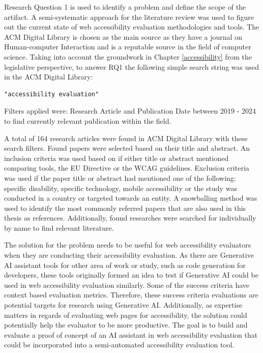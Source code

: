 Research Question 1 is used to identify a problem and define the scope of the artifact. A semi-systematic approach for the literature review was used to figure out the current state of web accessibility evaluation methodologies and tools. The ACM Digital Library is chosen as the main source as they have a journal on Human-computer Interaction and is a reputable source in the field of computer science. Taking into account the groundwork in Chapter \ref{accessibility} from the legislative perspective, to answer RQ1 the following simple search string was used in the ACM Digital Library:

\begin{verbatim}
"accessibility evaluation"
\end{verbatim}

Filters applied were: Research Article and Publication Date between 2019 - 2024 to find currently relevant publication within the field. 

A total of 164 research articles were found in ACM Digital Library with these search filters. Found papers were selected based on their title and abstract. An inclusion criteria was used based on if either title or abstract mentioned comparing tools, the EU Directive or the WCAG guidelines. Exclusion criteria was used if the paper title or abstract had mentioned one of the following: specific disability, specific technology, mobile accessibility or the study was conducted in a country or targeted towards an entity. A snowballing method was used to identify the most commonly referred papers that are also used in this thesis as references. Additionally, found researches were searched for individually by name to find relevant literature.

The solution for the problem needs to be useful for web accessibility evaluators when they are conducting their accessibility evaluation. As there are Generative AI assistant tools for other area of work or study, such as code generation for developers, these tools originally formed an idea to test if Generative AI could be used in web accessibility evaluation similarly. Some of the success criteria have context based evaluation metrics. Therefore, these success criteria evaluations are potential targets for research using Generative AI. Additionally, as expertise matters in regards of evaluating web pages for accessibility, the solution could potentially help the evaluator to be more productive. The goal is to build and evaluate a proof of concept of an AI assistant in web accessibility evaluation that could be incorporated into a semi-automated accessibility evaluation tool.

